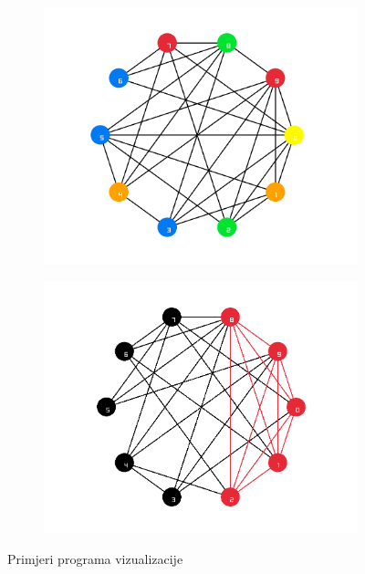 \documentclass[diplomskirad]{fer}
\begin{document}
\begin{figure}
  \centering
  \begin{subfigure}[b]{0.4\linewidth}
    \includegraphics[scale=0.23]{images/color.png}
  \end{subfigure}
  \hfill
  \begin{subfigure}[b]{0.4\linewidth}
    \includegraphics[scale=0.23]{images/clique.png}
  \end{subfigure}
  \caption{Primjeri programa vizualizacije}
  \label{fig:visualize}
\end{figure}
\end{document}
